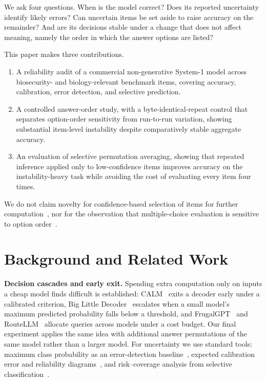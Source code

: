 \documentclass[conference,compsoc]{IEEEtran}
\begin{document}
We ask four questions. When is the model correct? Does its reported uncertainty identify
likely errors? Can uncertain items be set aside to raise accuracy on the remainder? And are
its decisions stable under a change that does not affect meaning, namely the order in which
the answer options are listed?

\noindent This paper makes three contributions.
\begin{enumerate}
\item A reliability audit of a commercial non-generative System-1 model across
      \statNItems{} biosecurity- and biology-relevant benchmark items, covering accuracy,
      calibration, error detection, and selective prediction.
\item A controlled answer-order study, with a byte-identical-repeat control that
separates option-order sensitivity from run-to-run variation, showing substantial item-level instability despite comparatively stable aggregate accuracy.
\item An evaluation of selective permutation averaging, showing that repeated inference
      applied only to low-confidence items improves accuracy on the instability-heavy task
      while avoiding the cost of evaluating every item four times.
\end{enumerate}

We do not claim novelty for confidence-based selection of items for further
computation~\cite{calm,bild,frugalgpt,routellm}, nor for the observation that
multiple-choice evaluation is sensitive to option order~\cite{alzahrani,gupta}.

\section{Background and Related Work}

\textbf{Decision cascades and early exit.} Spending extra computation only on
inputs a cheap model finds difficult is established: CALM~\cite{calm} exits a decoder
early under a calibrated criterion, Big Little Decoder~\cite{bild} escalates when a
small model's maximum predicted probability falls below a threshold, and
FrugalGPT~\cite{frugalgpt} and RouteLLM~\cite{routellm} allocate queries across models
under a cost budget. Our final experiment applies the same idea with additional answer
permutations of the same model rather than a larger model. For uncertainty we use
standard tools: maximum class probability as an error-detection
baseline~\cite{hendrycks}, expected calibration error and reliability
diagrams~\cite{guo}, and risk--coverage analysis from selective
classification~\cite{geifman}.
\end{document}
